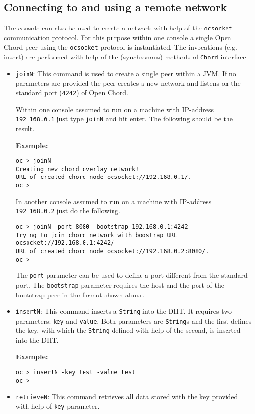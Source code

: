 \subsection{Connecting to and using a remote network}\label{remotecom}
The console can also be used to create a network with help of the 
{\tt ocsocket} communication protocol. For this purpose within one 
console a single Open Chord peer using the {\tt ocsocket} protocol 
is instantiated. The invocations (e.g. insert) are performed with help 
of the (synchronous) methods of {\tt Chord} interface. 

\begin{itemize}
%
\item {\tt joinN}: This command is used to create a single peer within 
a JVM. If no parameters are provided the peer creates a new network and 
listens on the standard port ({\tt 4242}) of Open Chord. 

Within one console assumed to run on a machine with IP-address 
{\tt 192.168.0.1} just type {\tt joinN} and hit enter. 
The following should be the result. 

{\bf Example:}
\begin{verbatim}
oc > joinN
Creating new chord overlay network!
URL of created chord node ocsocket://192.168.0.1/.
oc >
\end{verbatim}

In another console assumed to run on a machine with IP-address 
{\tt 192.168.0.2} just do the following. 

\begin{verbatim}
oc > joinN -port 8080 -bootstrap 192.168.0.1:4242
Trying to join chord network with boostrap URL ocsocket://192.168.0.1:4242/
URL of created chord node ocsocket://192.168.0.2:8080/.
oc >
\end{verbatim}

The {\tt port} parameter can be used to define a port different from the 
standard port. The {\tt bootstrap} parameter requires the host and the port 
of the bootstrap peer in the format shown above. 
%
\item {\tt insertN}: This command inserts a {\tt String} into the DHT. It requires 
two parameters: {\tt key} and {\tt value}. Both parameters are {\tt String}s and 
the first defines the key, with which the {\tt String} defined with help of the second, 
is inserted into the DHT. 

{\bf Example:}
\begin{verbatim}
oc > insertN -key test -value test
oc >
\end{verbatim}
%
\item {\tt retrieveN}: This command retrieves all data stored with 
the key provided with help of {\tt key} parameter. 


\end{itemize}
